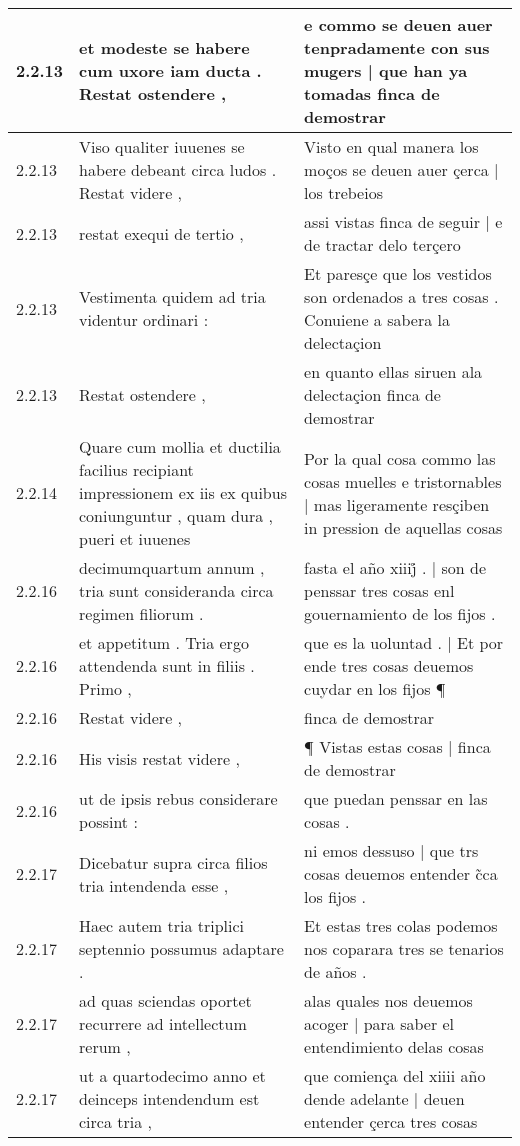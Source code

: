 \begin{tabular}{|p{1cm}|p{6.5cm}|p{6.5cm}|}
2.2.13 & et modeste se habere cum uxore iam ducta . Restat ostendere , & e commo se deuen auer tenpradamente con sus mugers | que han ya tomadas finca de demostrar \\\hline
2.2.13 & Viso qualiter iuuenes se habere debeant circa ludos . Restat videre , & Visto en qual manera los moços se deuen auer çerca | los trebeios \\\hline
2.2.13 & restat exequi de tertio , & assi vistas finca de seguir | e de tractar delo terçero \\\hline
2.2.13 & Vestimenta quidem ad tria videntur ordinari : & Et paresçe que los vestidos son ordenados a tres cosas . Conuiene a sabera la delectaçion \\\hline
2.2.13 & Restat ostendere , & en quanto ellas siruen ala delectaçion finca de demostrar \\\hline
2.2.14 & Quare cum mollia et ductilia facilius recipiant impressionem ex iis ex quibus coniunguntur , quam dura , pueri et iuuenes & Por la qual cosa commo las cosas muelles e tristornables | mas ligeramente resçiben in pression de aquellas cosas \\\hline
2.2.16 & decimumquartum annum , tria sunt consideranda circa regimen filiorum . & fasta el año xiiij̊ . | son de penssar tres cosas enl gouernamiento de los fijos . \\\hline
2.2.16 & et appetitum . Tria ergo attendenda sunt in filiis . Primo , & que es la uoluntad . | Et por ende tres cosas deuemos cuydar en los fijos ¶ \\\hline
2.2.16 & Restat videre , & finca de demostrar \\\hline
2.2.16 & His visis restat videre , & ¶ Vistas estas cosas | finca de demostrar \\\hline
2.2.16 & ut de ipsis rebus considerare possint : & que puedan penssar en las cosas . \\\hline
2.2.17 & Dicebatur supra circa filios tria intendenda esse , & ni emos dessuso | que trs cosas deuemos entender c̃ca los fijos . \\\hline
2.2.17 & Haec autem tria triplici septennio possumus adaptare . & Et estas tres colas podemos nos coparara tres se tenarios de años . \\\hline
2.2.17 & ad quas sciendas oportet recurrere ad intellectum rerum , & alas quales nos deuemos acoger | para saber el entendimiento delas cosas \\\hline
2.2.17 & ut a quartodecimo anno et deinceps intendendum est circa tria , & que comiença del xiiii año dende adelante | deuen entender çerca tres cosas \\\hline

\end{tabular}
